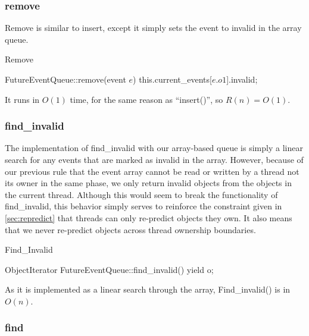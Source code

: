 \documentclass[CEJCS,PDF]{cej} %
\begin{document}
\subsubsection{remove}

Remove is similar to insert, except it simply sets the event to invalid in the array queue.

\begin{algorithm}
\caption{Remove}
\begin{algorithmic}
\STATE FutureEventQueue::remove(event $e$)
\STATE this.current\_events[$e.o1$].invalid;
\end{algorithmic}
\end{algorithm}

It runs in $O(1)$ time, for the same reason as ``insert()'', so $R(n)=O(1)$.

\subsubsection{find\_invalid}

The implementation of find\_invalid with our array-based queue is simply a linear search for any events that are marked as invalid in the array.
However, because of our previous rule that the event array cannot be read or written by a thread not its owner in the same phase, we only return invalid
objects from the objects in the current thread.  Although this would seem to break the functionality of find\_invalid, this behavior simply serves to reinforce
the constraint given in \ref{sec:repredict} that threads can only re-predict objects they own. It also means that we never re-predict objects across thread
ownership boundaries.  

\begin{algorithm}
\caption{Find\_Invalid}
\begin{algorithmic}
\STATE ObjectIterator FutureEventQueue::find\_invalid()
		\STATE {}
		\STATE yield o;
	\ENDIF
\ENDFOR
\end{algorithmic}
\end{algorithm}

As it is implemented as a linear search through the array, Find\_invalid() is in $O(n)$.  


\subsubsection{find}
\end{document}
